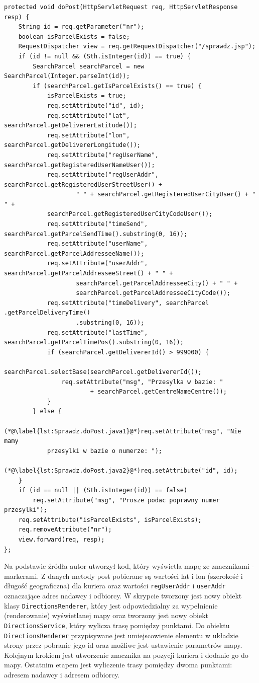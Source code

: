 \documentclass[eng,printmode,oneside]{mgr}
\begin{document}
\begin{lstlisting}[caption=Fragment klasy Sprawdz.Java\,
metoda doPost(),label=lst:Sprawdz.doPost.java]
protected void doPost(HttpServletRequest req, HttpServletResponse resp) {
	String id = req.getParameter("nr");
	boolean isParcelExists = false;
	RequestDispatcher view = req.getRequestDispatcher("/sprawdz.jsp");
	if (id != null && (Sth.isInteger(id)) == true) {
		SearchParcel searchParcel = new SearchParcel(Integer.parseInt(id));
		if (searchParcel.getIsParcelExists() == true) {
			isParcelExists = true;
			req.setAttribute("id", id);
			req.setAttribute("lat", searchParcel.getDelivererLatitude());
			req.setAttribute("lon", searchParcel.getDelivererLongitude());
			req.setAttribute("regUserName",	searchParcel.getRegisteredUserNameUser());
			req.setAttribute("regUserAddr",	searchParcel.getRegisteredUserStreetUser() +
					" " + searchParcel.getRegisteredUserCityUser() + " " +
			searchParcel.getRegisteredUserCityCodeUser()); 
			req.setAttribute("timeSend", searchParcel.getParcelSendTime().substring(0, 16));
			req.setAttribute("userName", searchParcel.getParcelAddresseeName());
			req.setAttribute("userAddr", searchParcel.getParcelAddresseeStreet() + " " +
					searchParcel.getParcelAddresseeCity() + " "	+ 
					searchParcel.getParcelAddresseeCityCode());
			req.setAttribute("timeDelivery", searchParcel .getParcelDeliveryTime()
					.substring(0, 16)); 
			req.setAttribute("lastTime", searchParcel.getParcelTimePos().substring(0, 16));
			if (searchParcel.getDelivererId() > 999000) {
				searchParcel.selectBase(searchParcel.getDelivererId());
				req.setAttribute("msg", "Przesylka w bazie: "
						+ searchParcel.getCentreNameCentre());
			}
		} else {
			(*@\label{lst:Sprawdz.doPost.java1}@*)req.setAttribute("msg", "Nie mamy
			przesylki w bazie o numerze: ");
			(*@\label{lst:Sprawdz.doPost.java2}@*)req.setAttribute("id", id); 
	}
	if (id == null || (Sth.isInteger(id)) == false)
		req.setAttribute("msg", "Prosze podac poprawny numer przesylki"); 
	req.setAttribute("isParcelExists", isParcelExists);
	req.removeAttribute("nr");
	view.forward(req, resp);
};
\end{lstlisting}

Na podstawie źródła \cite{developer.google.maps} autor utworzył kod,
który wyświetla mapę ze znacznikami - markerami. Z danych metody post pobierane
są wartości lat i lon (szerokość i długość geograficzna) dla kuriera oraz wartości
\texttt{regUserAddr} i \texttt{userAddr} oznaczające adres nadawcy i odbiorcy. W
skrypcie tworzony jest nowy obiekt klasy \texttt{DirectionsRenderer}, który jest
odpowiedzialny za wypełnienie (renderowanie) wyświetlanej mapy oraz tworzony
jest nowy obiekt \texttt{DirectionsService}, który wylicza trasę pomiędzy punktami.
Do obiektu \texttt{DirectionsRenderer} przypisywane jest umiejscowienie elementu
w układzie strony przez pobranie jego id oraz możliwe jest ustawienie parametrów mapy.
Kolejnym krokiem jest utworzenie znacznika na pozycji kuriera i dodanie go do
mapy. Ostatnim etapem jest wyliczenie trasy pomiędzy dwoma punktami: adresem
nadawcy i adresem odbiorcy.
\end{document}
